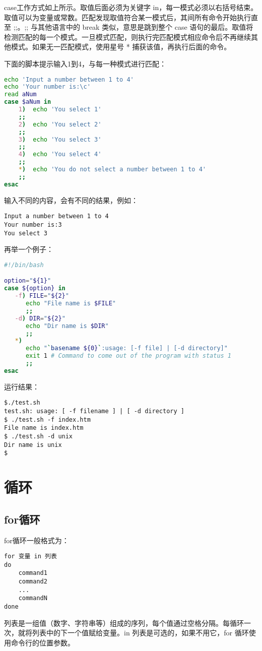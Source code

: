 case工作方式如上所示。取值后面必须为关键字 in，每一模式必须以右括号结束。取值可以为变量或常数。匹配发现取值符合某一模式后，其间所有命令开始执行直至 ;;。;; 与其他语言中的 break 类似，意思是跳到整个 case 语句的最后。取值将检测匹配的每一个模式。一旦模式匹配，则执行完匹配模式相应命令后不再继续其他模式。如果无一匹配模式，使用星号 * 捕获该值，再执行后面的命令。

下面的脚本提示输入1到4，与每一种模式进行匹配：
\begin{lstlisting}[language=sh]
echo 'Input a number between 1 to 4'
echo 'Your number is:\c'
read aNum
case $aNum in
    1)  echo 'You select 1'
    ;;
    2)  echo 'You select 2'
    ;;
    3)  echo 'You select 3'
    ;;
    4)  echo 'You select 4'
    ;;
    *)  echo 'You do not select a number between 1 to 4'
    ;;
esac
\end{lstlisting}
输入不同的内容，会有不同的结果，例如：
\begin{verbatim}
Input a number between 1 to 4
Your number is:3
You select 3
\end{verbatim}
再举一个例子：
\begin{lstlisting}[language=sh]
#!/bin/bash

option="${1}"
case ${option} in
   -f) FILE="${2}"
      echo "File name is $FILE"
      ;;
   -d) DIR="${2}"
      echo "Dir name is $DIR"
      ;;
   *) 
      echo "`basename ${0}`:usage: [-f file] | [-d directory]"
      exit 1 # Command to come out of the program with status 1
      ;;
esac
\end{lstlisting}
运行结果：
\begin{verbatim}
$./test.sh
test.sh: usage: [ -f filename ] | [ -d directory ]
$ ./test.sh -f index.htm
File name is index.htm
$ ./test.sh -d unix
Dir name is unix
$
\end{verbatim}


\section{循环}
\subsection{for循环}
for循环一般格式为：
\begin{verbatim}
for 变量 in 列表
do
    command1
    command2
    ...
    commandN
done
\end{verbatim}

列表是一组值（数字、字符串等）组成的序列，每个值通过空格分隔。每循环一次，就将列表中的下一个值赋给变量。in 列表是可选的，如果不用它，for 循环使用命令行的位置参数。

